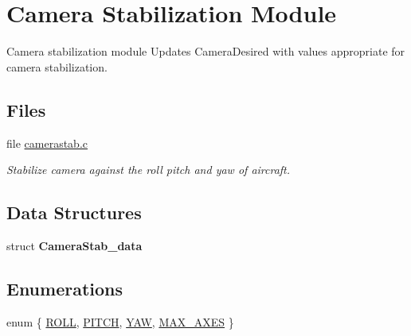 \hypertarget{group___camera_stab}{\section{Camera Stabilization Module}
\label{group___camera_stab}
}


Camera stabilization module Updates Camera\-Desired with values appropriate for camera stabilization.  


\subsection*{Files}
\begin{DoxyCompactItemize}
\item 
file \hyperlink{camerastab_8c}{camerastab.\-c}
\begin{DoxyCompactList}\small\item\em Stabilize camera against the roll pitch and yaw of aircraft. \end{DoxyCompactList}\end{DoxyCompactItemize}
\subsection*{Data Structures}
\begin{DoxyCompactItemize}
\item 
struct {\bfseries Camera\-Stab\-\_\-data}
\end{DoxyCompactItemize}
\subsection*{Enumerations}
\begin{DoxyCompactItemize}
\item 
enum \{ \hyperlink{group___camera_stab_gga99fb83031ce9923c84392b4e92f956b5a2eeb9fef8a6a516fa6437a44a6efbd52}{R\-O\-L\-L}, 
\hyperlink{group___camera_stab_gga99fb83031ce9923c84392b4e92f956b5aa4ed247aa19723caf868d2b2dd5cf4ff}{P\-I\-T\-C\-H}, 
\hyperlink{group___camera_stab_gga99fb83031ce9923c84392b4e92f956b5a60ae774ecd1cf97a0e91f76970d64491}{Y\-A\-W}, 
\hyperlink{group___camera_stab_gga99fb83031ce9923c84392b4e92f956b5aaacb851954fab4e8ccf0d09acc8ef697}{M\-A\-X\-\_\-\-A\-X\-E\-S}
 \}
\end{DoxyCompactItemize}
